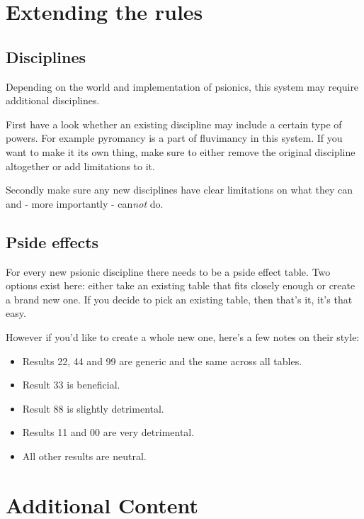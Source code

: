 \documentclass[12pt,a4paper,openany,usenames,dvipsnames]{book}
\begin{document}
	\chapter{Extending the rules}
	\section{Disciplines}
	Depending on the world and implementation of psionics, this system may require additional disciplines.\par
	First have a look whether an existing discipline may include a certain type of powers. For example pyromancy is a part of fluvimancy in this system. If you want to make it its own thing, make sure to either remove the original discipline altogether or add limitations to it.\par
	Secondly make sure any new disciplines have clear limitations on what they can and - more importantly - can\emph{not} do.
	\section{Pside effects}
	For every new psionic discipline there needs to be a pside effect table. Two options exist here: either take an existing table that fits closely enough or create a brand new one. If you decide to pick an existing table, then that's it, it's that easy.\par
	However if you'd like to create a whole new one, here's a few notes on their style:
	\begin{itemize}
		\item Results 22, 44 and 99 are generic and the same across all tables.
		\item Result 33 is beneficial.
		\item Result 88 is slightly detrimental.
		\item Results 11 and 00 are very detrimental.
		\item All other results are neutral.
	\end{itemize}

	\chapter{Additional Content}
	\label{ch:addcontent}
\end{document}
